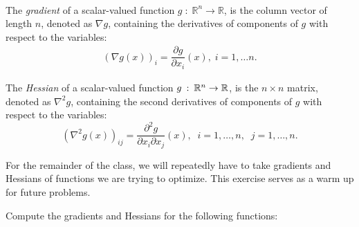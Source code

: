 \\
The \textit{gradient} of a scalar-valued function $g \; : \; \mathbb{R}^n \rightarrow \mathbb{R}$, is the column vector of length $n$, denoted as $\nabla g$, containing the derivatives of components of $g$ with respect to the variables:
\begin{align*}
(\nabla g(x))_i = \dfrac{\partial g}{\partial x_i} (x), \; i = 1,\hdots n.
\end{align*}

The \textit{Hessian} of a scalar-valued function $g \::\: \mathbb{R}^{n} \rightarrow \mathbb{R}$, is the $n \times n$ matrix, denoted as $\nabla^2 g$, containing the second derivatives of components of $g$ with respect to the variables:
\[
(\nabla^2 g(x))_{ij} = \frac{\partial^2 g}{\partial x_i \partial x_j}(x), \;\; i=1,\ldots,n, \;\; j=1,\ldots,n.
\]

For the remainder of the class, we will repeatedly have to take gradients and Hessians of functions we are trying to optimize. This exercise serves as a warm up for future problems.

Compute the gradients and Hessians for the following functions:

\begin{enumerate}


\sol{}



\sol{}



\sol{}



\sol{}
\end{enumerate}


